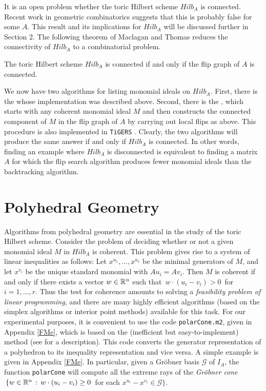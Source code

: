 It is an open problem whether the toric Hilbert scheme $Hilb_A$ is
connected. Recent work in geometric combinatorics \cite{HS:San} suggests
that this is probably false for some $A$. This result and its 
implications for $Hilb_A$ will be discussed further in Section 2.
The following theorem of Maclagan and Thomas \cite{HS:MT} reduces the  
connectivity of $Hilb_A$ to a combinatorial problem.

\begin{theorem} 
The toric Hilbert scheme $Hilb_A$ is connected if and only if the 
flip graph of $A$ is connected.
\end{theorem}

We now have two algorithms for listing monomial ideals on $Hilb_A$.
First, there is the {\it {}} whose \Mtwo
implementation was described above.  Second, there is the {\it {}}, which starts with any coherent monomial ideal $M$
and then constructs the connected component of $M$ in the flip graph
of $A$ by carrying out local flips as above.  This procedure is also 
implemented in {\tt TiGERS} \cite{HS:HT}. Clearly, the two algorithms
will produce the same answer if and only if $Hilb_A$ is connected. In
other words, finding an example where $Hilb_A$ is disconnected is
equivalent to finding a matrix $A$ for which the flip search algorithm
produces fewer monomial ideals than the backtracking algorithm.

\section{Polyhedral Geometry}

Algorithms from polyhedral geometry are essential in the study of the
toric Hilbert scheme. Consider the problem of deciding whether or not
a given monomial ideal $M$ in $Hilb_A$ is coherent.  This problem
gives rise to a system of linear inequalities as follows: Let
$x^{u_1}, \ldots, x^{u_r}$ be the minimal generators of $M$, and let
$x^{v_i}$ be the unique standard monomial with $A u_i = A v_i$. Then
$M$ is coherent if and only if there exists a vector $w \in \mathbb{R}^n$ such
that $\,w \cdot (u_i - v_i) > 0\,$ for $i =1,\ldots,r$.  Thus the test
for coherence amounts to solving a {\sl feasibility problem of linear
programming}, and there are many highly efficient algorithms (based on
the simplex algorithms or interior point methods) available for this
task. For our experimental purposes, it is convenient to use the code
{\tt polarCone.m2}, given in Appendix \ref{FMe}, which is based on the
(inefficient but easy-to-implement) {\em {}}
method (see \cite{HS:Zie} for a description).  This code converts the
generator representation of a polyhedron to its inequality
representation and vice versa. A simple example is given in Appendix
\ref{FMe}. In particular, given a Gr\"obner basis $\mathcal G$ of $I_A$, the
function {\tt polarCone} will compute all the extreme rays of the {\em
Gr\"obner cone} $\,\{ w \in \mathbb{R}^n \,: \,w \cdot (u_i - v_i) \geq 0\,$
for each $x^{u_i}-x^{v_i} \in {\mathcal G}\}.$

